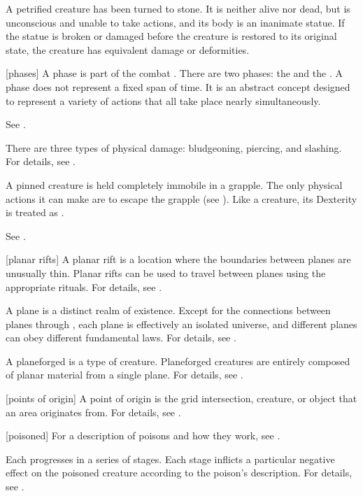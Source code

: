  A petrified creature has been turned to stone. It is neither alive nor dead, but is unconscious and unable to take actions, and its body is an inanimate statue. If the statue is broken or damaged before the creature is restored to its original state, the creature has equivalent damage or deformities.

[phases] A phase is part of the combat .
There are two phases: the  and the .
A phase does not represent a fixed span of time.
It is an abstract concept designed to represent a variety of actions that all take place nearly simultaneously.

 See .

 There are three types of physical damage: bludgeoning, piercing, and slashing.
For details, see .

 A pinned creature is held completely immobile in a grapple.
The only physical actions it can make are to escape the grapple (see ).
Like a  creature, its Dexterity is treated as .

 See .

[planar rifts] A planar rift is a location where the boundaries between planes are unusually thin.
Planar rifts can be used to travel between planes using the appropriate rituals.
For details, see .

 A plane is a distinct realm of existence.
Except for the connections between planes through , each plane is effectively an isolated universe, and different planes can obey different fundamental laws.
For details, see .

 A planeforged is a type of creature.
Planeforged creatures are entirely composed of planar material from a single plane.
For details, see .

[points of origin] A point of origin is the grid intersection, creature, or object that an area originates from.
For details, see .

[poisoned] For a description of poisons and how they work, see .

 Each  progresses in a series of stages.
Each stage inflicts a particular negative effect on the poisoned creature according to the poison's description.
For details, see .

